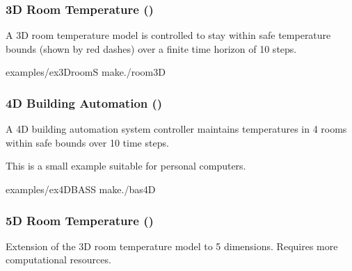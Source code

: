 \documentclass[a4paper,10pt,english]{sphinxmanual}
\let\sphinxpxdimen\pdfpxdimen\else\newdimen\sphinxpxdimen
\begin{document}
\subsubsection{3D Room Temperature ()}
\label{\detokenize{examples/safety:d-room-temperature-ex-3droom-s}}
\noindent{\hspace*{\fill}\sphinxincludegraphics[width=500\sphinxpxdimen]{{fig3}.png}\hspace*{\fill}}

\sphinxAtStartPar
A 3D room temperature model is controlled to stay within safe temperature bounds
(shown by red dashes) over a finite time horizon of 10 steps.

\sphinxAtStartPar
{}

\begin{sphinxVerbatim}[commandchars=\\\{\}]
examples/ex\PYGZus{}3Droom\PYGZhy{}S
make./room3D
\end{sphinxVerbatim}


\subsubsection{4D Building Automation ()}
\label{\detokenize{examples/safety:d-building-automation-ex-4dbas-s}}
\noindent{\hspace*{\fill}\sphinxincludegraphics[width=500\sphinxpxdimen]{{fig4}.png}\hspace*{\fill}}

\sphinxAtStartPar
A 4D building automation system controller maintains temperatures in 4 rooms
within safe bounds over 10 time steps.

\sphinxAtStartPar
This is a small example suitable for personal computers.

\sphinxAtStartPar
{}

\begin{sphinxVerbatim}[commandchars=\\\{\}]
examples/ex\PYGZus{}4DBAS\PYGZhy{}S
make./bas4D
\end{sphinxVerbatim}


\subsubsection{5D Room Temperature ()}
\label{\detokenize{examples/safety:d-room-temperature-ex-5droom-s}}
\sphinxAtStartPar
Extension of the 3D room temperature model to 5 dimensions. Requires more
computational resources.
\end{document}
